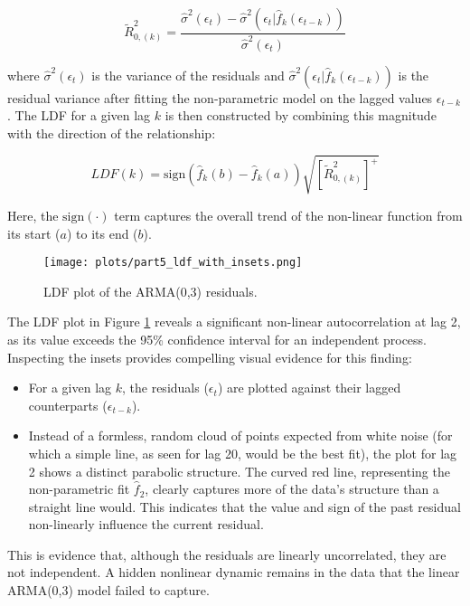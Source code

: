 \documentclass{article}
\begin{document}
\begin{equation}
    \tilde{R}^2_{0,(k)} = \frac{\hat{\sigma}^2(\epsilon_t) - \hat{\sigma}^2(\epsilon_t | \hat{f}_k(\epsilon_{t-k}))}{\hat{\sigma}^2(\epsilon_t)}
\end{equation}

where $\hat{\sigma}^2(\epsilon_t)$ is the variance of the residuals and $\hat{\sigma}^2(\epsilon_t | \hat{f}_k(\epsilon_{t-k}))$ is the residual variance after fitting the non-parametric model on the lagged values $\epsilon_{t-k}$. The LDF for a given lag $k$ is then constructed by combining this magnitude with the direction of the relationship:

\begin{equation}
    LDF(k) = \text{sign}(\hat{f}_k(b) - \hat{f}_k(a)) \sqrt{[\tilde{R}^2_{0,(k)}]^{+}}
\end{equation}

Here, the $\text{sign}(\cdot)$ term captures the overall trend of the non-linear function from its start ($a$) to its end ($b$).

\begin{figure}[H]
    \centering
    \texttt{[image: plots/part5\_ldf\_with\_insets.png]}
    \caption{LDF plot of the ARMA(0,3) residuals.}
    \label{fig:part5_ldf_plot}
\end{figure}

The LDF plot in Figure \ref{fig:part5_ldf_plot} reveals a significant non-linear autocorrelation at lag 2, as its value exceeds the 95\% confidence interval for an independent process. Inspecting the insets provides compelling visual evidence for this finding:
\begin{itemize}
    \item For a given lag $k$, the residuals ($\epsilon_t$) are plotted against their lagged counterparts ($\epsilon_{t-k}$).
    \item Instead of a formless, random cloud of points expected from white noise (for which a simple line, as seen for lag 20, would be the best fit), the plot for lag 2 shows a distinct parabolic structure. The curved red line, representing the non-parametric fit $\hat{f}_2$, clearly captures more of the data's structure than a straight line would. This indicates that the value and sign of the past residual non-linearly influence the current residual.
\end{itemize}
This is evidence that, although the residuals are linearly uncorrelated, they are not independent. A hidden nonlinear dynamic remains in the data that the linear ARMA(0,3) model failed to capture.
\end{document}
